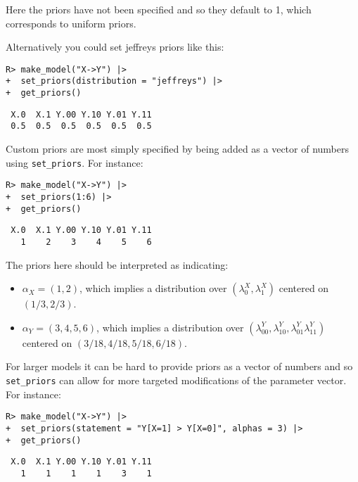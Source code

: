\documentclass[
  11pt,
  article]{jss}
\providecommand{\tightlist}{%
  \setlength{\itemsep}{0pt}\setlength{\parskip}{0pt}}\usepackage{longtable,booktabs,array}
\begin{document}
Here the priors have not been specified and so they default to 1, which
corresponds to uniform priors.

Alternatively you could set jeffreys priors like this:

\begin{verbatim}
R> make_model("X->Y") |> 
+  set_priors(distribution = "jeffreys") |> 
+  get_priors()
\end{verbatim}

\begin{verbatim}
 X.0  X.1 Y.00 Y.10 Y.01 Y.11 
 0.5  0.5  0.5  0.5  0.5  0.5 
\end{verbatim}

Custom priors are most simply specified by being added as a vector of
numbers using \texttt{set\_priors}. For instance:

\begin{verbatim}
R> make_model("X->Y") |> 
+  set_priors(1:6) |> 
+  get_priors()
\end{verbatim}

\begin{verbatim}
 X.0  X.1 Y.00 Y.10 Y.01 Y.11 
   1    2    3    4    5    6 
\end{verbatim}

The priors here should be interpreted as indicating:

\begin{itemize}
\tightlist
\item
  \(\alpha_X = (1,2)\), which implies a distribution over
  \((\lambda^X_0, \lambda^X_1)\) centered on \((1/3, 2/3)\).
\item
  \(\alpha_Y = (3,4,5,6)\), which implies a distribution over
  \((\lambda^Y_{00}, \lambda^Y_{10}, \lambda^Y_{01} \lambda^Y_{11})\)
  centered on \((3/18, 4/18, 5/18, 6/18)\).
\end{itemize}

For larger models it can be hard to provide priors as a vector of
numbers and so \texttt{set\_priors} can allow for more targeted
modifications of the parameter vector. For instance:

\begin{verbatim}
R> make_model("X->Y") |>
+  set_priors(statement = "Y[X=1] > Y[X=0]", alphas = 3) |>
+  get_priors()
\end{verbatim}

\begin{verbatim}
 X.0  X.1 Y.00 Y.10 Y.01 Y.11 
   1    1    1    1    3    1 
\end{verbatim}
\end{document}
